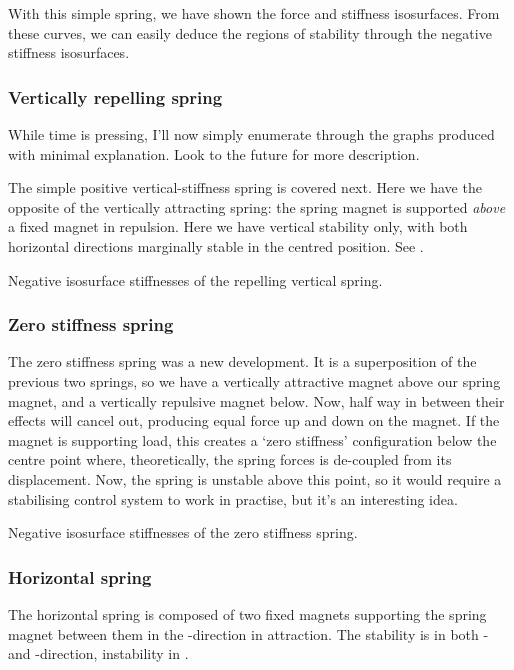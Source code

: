 With this simple spring, we have shown the force and stiffness isosurfaces.
From these curves, we can easily deduce the regions of stability through the
negative stiffness isosurfaces.

\subsubsection{Vertically repelling spring}

While time is pressing, I'll now simply enumerate through the graphs produced
with minimal explanation. Look to the future for more description.

The simple positive vertical-stiffness spring is covered next. Here we have
the opposite of the vertically attracting spring: the spring magnet is
supported \emph{above} a fixed magnet in repulsion. Here we have vertical
stability only, with both horizontal directions marginally stable in the
centred position. See .

  {Negative isosurface stiffnesses of the repelling vertical spring.}

\subsubsection{Zero stiffness spring}

The zero stiffness spring was a new development. It is a superposition of the
previous two springs, so we have a vertically attractive magnet above our
spring magnet, and a vertically repulsive magnet below. Now, half way in
between their effects will cancel out, producing equal force up and down on
the magnet. If the magnet is supporting load, this creates a `zero stiffness'
configuration below the centre point where, theoretically, the spring forces
is de-coupled from its displacement. Now, the spring is unstable above this
point, so it would require a stabilising control system to work in practise,
but it's an interesting idea.

  {Negative isosurface stiffnesses of the zero stiffness spring.}

\subsubsection{Horizontal spring}

The horizontal spring is composed of two fixed magnets supporting the spring
magnet between them in the \x-direction in attraction. The stability is in
both \y- and \z-direction, instability in \x.

